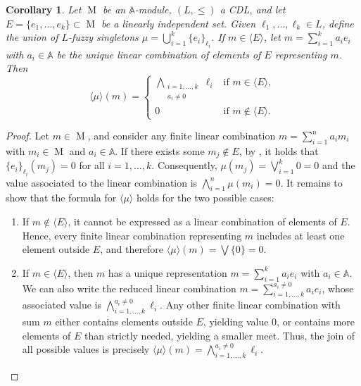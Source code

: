 \documentclass[a4paper,10pt]{article}
\newtheorem{corollary}[theorem]{Corollary}
\newcommand{\bba}{\mathbb{A}}
\DeclareMathOperator{\Mo}{M}
\begin{document}
\begin{corollary}
\label{cor:singletons_generating}
Let \(\Mo\) be an \(\bba\)-module, \((L,\leq)\) a CDL, and let 
\(E = \{e_1, \ldots, e_k\} \subset \Mo\) be a linearly independent set.  
Given \(\ell_1, \ldots, \ell_k \in L\), define the union of \(L\)-fuzzy singletons 
\(\mu = \bigcup_{i=1}^k \{e_i\}_{\ell_i}\). If \(m \in \langle E \rangle\), let 
\(m = \sum_{i=1}^k a_i e_i\) with \(a_i \in \bba\) be the unique linear combination of elements of \(E\) representing \(m\). 
Then
\[
\langle \mu \rangle(m) =
\begin{cases}
\displaystyle \bigwedge_{\substack{i=1,\ldots,k \\ a_i \neq 0}} \ell_i 
& \text{if } m \in \langle E \rangle, \\[0.8em]
0 
& \text{if } m \notin \langle E \rangle.
\end{cases}
\]
\end{corollary}

\begin{proof}
Let \(m \in \Mo\), and consider any finite linear combination 
\(m = \sum_{i=1}^{n} a_i m_i\) with \(m_i \in \Mo\) and \(a_i \in \bba\).  
If there exists some \(m_j \notin E\), 
by , it holds that \(\{e_i\}_{\ell_i}(m_j)=0\) for all \(i=1,\dots,k\). Consequently, 
\(\mu(m_j) = \bigvee_{i=1}^k 0=0\) and the value associated to the linear combination is \(\bigwedge_{i=1}^{n} \mu(m_i) = 0\). It remains to show that the formula for \(\langle \mu\rangle\) holds for the two possible cases:
\begin{enumerate}[label=\roman*)]
\item If \(m \notin \langle E \rangle\), it cannot be expressed as a linear combination of elements of \(E\).  
Hence, every finite linear combination representing \(m\) includes at least one element outside \(E\), and therefore \(\langle \mu \rangle(m) = \bigvee \{0\} = 0\).
\item If \(m \in \langle E \rangle\), then \(m\) has a unique representation 
\(m = \sum_{i=1}^k a_i e_i\) with \(a_i \in \bba\). 
We can also write the reduced linear combination 
\(m=\sum_{i=1,\ldots,k}^{a_i \neq 0} a_i e_i\),
whose associated value is
\(\bigwedge_{i=1,\ldots,k}^{a_i \neq 0} \ell_i\).  
Any other finite linear combination with sum \(m\) either contains elements outside \(E\), yielding value \(0\), or contains more elements of \(E\) than strictly needed, yielding a smaller meet.  
Thus, the join of all possible values is precisely
\(\langle \mu \rangle(m) = \bigwedge_{i=1,\ldots,k}^{a_i \neq 0} \ell_i\). \qedhere
\end{enumerate}
\end{proof}
\end{document}
